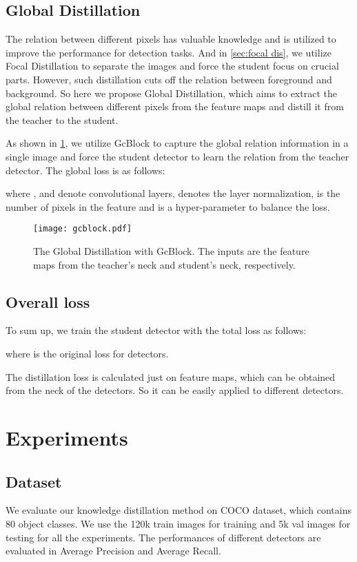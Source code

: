 \documentclass[10pt,twocolumn,letterpaper]{article}
\begin{document}
\subsection{Global Distillation}
The relation\cite{wang2018non, hu2018relation, cao2019gcnet} between different pixels has valuable knowledge and is utilized to improve the performance for detection tasks. And in \cref{sec:focal dis}, we utilize Focal Distillation to separate the images and force the student focus on crucial parts. However, such distillation cuts off the relation between foreground and background. So here we propose Global Distillation, which aims to extract the global relation between different pixels from the feature maps and distill it from the teacher to the student.

As shown in \cref{figure:gcblock}, we utilize GcBlock\cite{cao2019gcnet} to capture the global relation information in a single image and force the student detector to learn the relation from the teacher detector. The global loss  is as follows:

where ,  and  denote convolutional layers,  denotes the layer normalization,  is the number of pixels in the feature and  is a hyper-parameter to balance the loss.
\begin{figure}
  \centering
  \texttt{[image: gcblock.pdf]}
  \caption{The Global Distillation with GcBlock. The inputs are the feature maps from the teacher's neck and student's neck, respectively.}
  \label{figure:gcblock}
\end{figure}

\subsection{Overall loss}
To sum up, we train the student detector with the total loss as follows:

where  is the original loss for detectors.

The distillation loss is calculated just on feature maps, which can be obtained from the neck of the detectors. So it can be easily applied to different detectors.

\section{Experiments}
\label{sec:experiments}
\subsection{Dataset}
We evaluate our knowledge distillation method on COCO dataset\cite{lin2014microsoft}, which contains 80 object classes. We use the 120k train images for training and 5k val images for testing for all the experiments. The performances of different detectors are evaluated in Average Precision and Average Recall.
\end{document}
